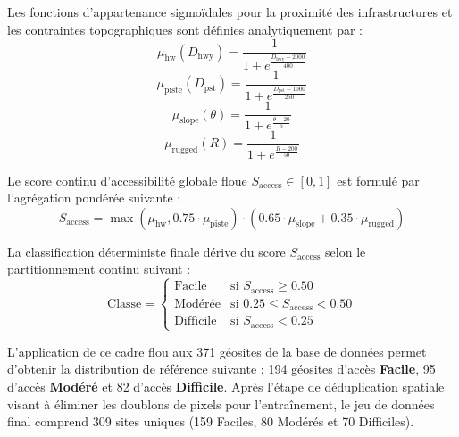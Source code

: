 \documentclass[11pt,twocolumn,a4paper]{article}
\begin{document}
Les fonctions d'appartenance sigmoïdales pour la proximité des infrastructures et les contraintes topographiques sont définies analytiquement par :
\begin{equation}
\mu_{\text{hw}}(D_{\text{hwy}}) = \frac{1}{1 + e^{\frac{D_{\text{hwy}} - 2000}{400}}}
\end{equation}
\begin{equation}
\mu_{\text{piste}}(D_{\text{pst}}) = \frac{1}{1 + e^{\frac{D_{\text{pst}} - 1000}{250}}}
\end{equation}
\begin{equation}
\mu_{\text{slope}}(\theta) = \frac{1}{1 + e^{\frac{\theta - 20}{5}}}
\end{equation}
\begin{equation}
\mu_{\text{rugged}}(R) = \frac{1}{1 + e^{\frac{R - 200}{50}}}
\end{equation}

Le score continu d'accessibilité globale floue $S_{\text{access}} \in [0, 1]$ est formulé par l'agrégation pondérée suivante :
\begin{equation}
S_{\text{access}} = \max\left(\mu_{\text{hw}}, 0.75 \cdot \mu_{\text{piste}}\right) \cdot \left(0.65 \cdot \mu_{\text{slope}} + 0.35 \cdot \mu_{\text{rugged}}\right)
\end{equation}

La classification déterministe finale dérive du score $S_{\text{access}}$ selon le partitionnement continu suivant :
\begin{equation}
\text{Classe} = \begin{cases}
\text{Facile} & \text{si } S_{\text{access}} \ge 0.50 \\
\text{Modérée} & \text{si } 0.25 \le S_{\text{access}} < 0.50 \\
\text{Difficile} & \text{si } S_{\text{access}} < 0.25
\end{cases}
\end{equation}

L'application de ce cadre flou aux 371 géosites de la base de données permet d'obtenir la distribution de référence suivante : 194 géosites d'accès \textbf{Facile}, 95 d'accès \textbf{Modéré} et 82 d'accès \textbf{Difficile}. Après l'étape de déduplication spatiale visant à éliminer les doublons de pixels pour l'entraînement, le jeu de données final comprend 309 sites uniques (159 Faciles, 80 Modérés et 70 Difficiles).
\end{document}
